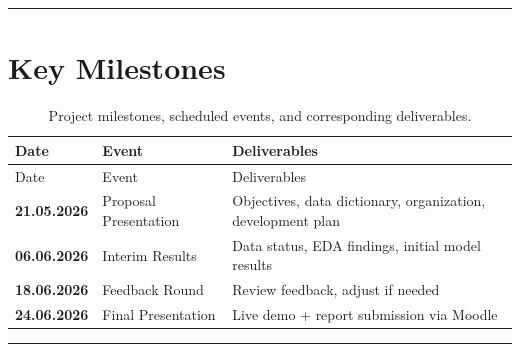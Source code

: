 \documentclass[
  english,
  letterpaper,
  DIV=11,
  numbers=noendperiod]{scrreprt}
\begin{document}
\begin{center}\rule{0.5\linewidth}{0.5pt}\end{center}

\section{Key Milestones}\label{key-milestones}

\begin{longtable}[]{@{}
  >{\raggedright\arraybackslash}p{}
  >{\raggedright\arraybackslash}p{}
  >{\raggedright\arraybackslash}p{}@{}}
\caption{Project milestones, scheduled events, and corresponding
deliverables.}\label{tbl-milestones}\tabularnewline
\toprule\noalign{}
\begin{minipage}[b]{\linewidth}\raggedright
Date
\end{minipage} & \begin{minipage}[b]{\linewidth}\raggedright
Event
\end{minipage} & \begin{minipage}[b]{\linewidth}\raggedright
Deliverables
\end{minipage} \\
\midrule\noalign{}
\endfirsthead
\toprule\noalign{}
\begin{minipage}[b]{\linewidth}\raggedright
Date
\end{minipage} & \begin{minipage}[b]{\linewidth}\raggedright
Event
\end{minipage} & \begin{minipage}[b]{\linewidth}\raggedright
Deliverables
\end{minipage} \\
\midrule\noalign{}
\endhead
\bottomrule\noalign{}
\endlastfoot
\textbf{21.05.2026} & Proposal Presentation & Objectives, data
dictionary, organization, development plan \\
\textbf{06.06.2026} & Interim Results & Data status, EDA findings,
initial model results \\
\textbf{18.06.2026} & Feedback Round & Review feedback, adjust if
needed \\
\textbf{24.06.2026} & Final Presentation & Live demo + report submission
via Moodle \\
\end{longtable}

\begin{center}\rule{0.5\linewidth}{0.5pt}\end{center}
\end{document}
